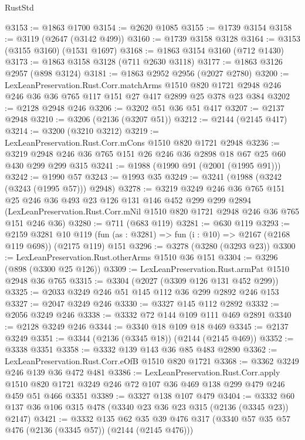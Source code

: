 \begin{lexlean}{RustStd}
\begin{coremodule}
@3153 := @1863 @1700
@3154 := @2620 @1085
@3155 := @1739 @3154
@3158 := @3119 (@2647 (@3142 @499))
@3160 := @1739 @3158 @3128
@3164 := @3153 (@3155 @3160) (@1531 @1697)
@3168 := @1863 @3154 @3160 (@712 @1430)
@3173 := @1863 @3158 @3128 (@711 @2630 @3118)
@3177 := @1863 @3126 @2957 (@898 @3124)
@3181 := @1863 @2952 @2956 (@2027 @2780)
@3200 := LexLeanPreservation.Rust.Corr.matchArms
    @1510
    @820
    @1721
    @2948
    @246
    @246
    @36
    @36
    @765
    @117
    @151
    @27
    @417
    @2899
    @25
    @378
    @23
    @384
@3202 := @2128 @2948 @246
@3206 := @3202 @51 @36 @51 @417
@3207 := @2137 @2948
@3210 := @3206 (@2136 (@3207 @51))
@3212 := @2144 (@2145 @417)
@3214 := @3200 (@3210 @3212)
@3219 := LexLeanPreservation.Rust.Corr.mCons @1510 @820 @1721 @2948
@3236 := @3219 @2948 @246 @36 @765 @151 @26 @246 @36 @2898 @18 @67 @25 @60 @430 @299 @299 @315
@3241 := @1988 (@1990 @91 (@2001 (@1995 @91)))
@3242 := @1990 @57
@3243 := @1993 @35
@3249 := @3241 (@1988 (@3242 (@3243 (@1995 @57))) @2948)
@3278 := @3219
    @3249
    @246
    @36
    @765
    @151
    @25
    @246
    @36
    @493
    @23
    @126
    @131
    @146
    @452
    @299
    @299
    @2894
    (LexLeanPreservation.Rust.Corr.mNil @1510 @820 @1721 @2948 @246 @36 @765 @151 @246 @36)
@3280 := @711 (@683 @119)
@3281 := @630 @119
@3293 := @2159
    @3281
    @10
    @119
    (fun (as : @3281) => fun (i : @10) => @2167 (@2168 @119 @698))
    (@2175 @119)
    @151
@3296 := @3278 (@3280 (@3293 @23))
@3300 := LexLeanPreservation.Rust.otherArms @1510 @36 @151
@3304 := @3296 (@898 (@3300 @25 @126))
@3309 := LexLeanPreservation.Rust.armPat @1510 @2948 @36 @765
@3315 := @3304 (@2027 (@3309 @126 @131 @452 @299))
@3325 := @2033 @3249 @246 @51 @145 @112 @36 @299 @2892 @246 @153
@3327 := @2047 @3249 @246
@3330 := @3327 @145 @112 @2892
@3332 := @2056 @3249 @246
@3338 := @3332 @72 @144 @109 @111 @469 @2891
@3340 := @2128 @3249 @246
@3344 := @3340 @18 @109 @18 @469
@3345 := @2137 @3249
@3351 := @3344 (@2136 (@3345 @18)) (@2144 (@2145 @469))
@3352 := @3338 @3351
@3358 := @3332 @139 @143 @36 @85 @483 @2890
@3362 := LexLeanPreservation.Rust.Corr.eOfB @1510 @820 @1721
@3368 := @3362 @3249 @246 @139 @36 @472 @481
@3386 := LexLeanPreservation.Rust.Corr.apply
    @1510
    @820
    @1721
    @3249
    @246
    @72
    @107
    @36
    @469
    @138
    @299
    @479
    @246
    @459
    @51
    @466
    @3351
@3389 := @3327 @138 @107 @479
@3404 := @3332 @60 @137 @36 @106 @315 @478 (@3340 @23 @36 @23 @315 (@2136 (@3345 @23)) @2147)
@3421 := @3332
    @135
    @62
    @35
    @39
    @476
    @317
    (@3340 @57 @35 @57 @476 (@2136 (@3345 @57)) (@2144 (@2145 @476)))

\end{coremodule}
\end{lexlean}
